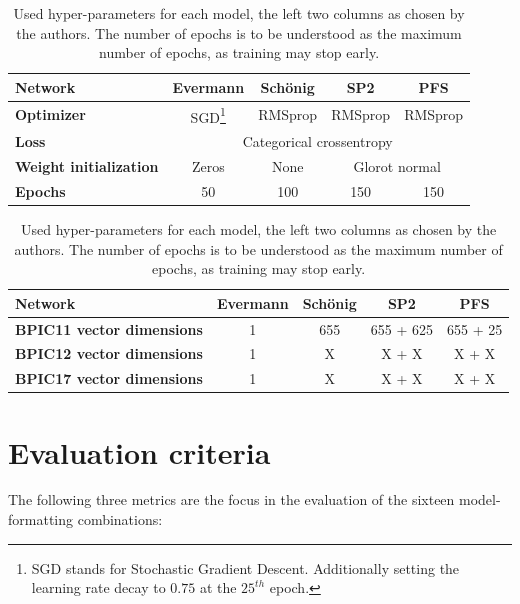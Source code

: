 \begin{table}[ht!]
    \centering
    \begin{tabular}{lcccc}
        \textbf{Network} & \textbf{Evermann} & \textbf{Schönig} & \textbf{SP2} & \textbf{PFS}\\
        \hline
        \textbf{Optimizer} & SGD\footnote{SGD stands for Stochastic Gradient Descent. Additionally setting the learning rate decay to $0.75$ at the $25^{th}$ epoch.} & RMSprop  & RMSprop & RMSprop\\
        \textbf{Loss}    &\multicolumn{4}{c}{Categorical crossentropy}\\
        \textbf{Weight initialization} & Zeros & None & \multicolumn{2}{c}{Glorot normal}\\
        \textbf{Epochs}  & 50 & 100 & 150 & 150\\
    \end{tabular}
    \caption{Used hyper-parameters for each model, the left two columns as chosen by the authors. The number of epochs is to be understood as the maximum number of epochs, as training may stop early.}
    \label{tab:training-setup}
\end{table}
\begin{table}[ht!]
    \centering
    \begin{tabular}{lcccc}
        \textbf{Network} & \textbf{Evermann} & \textbf{Schönig} & \textbf{SP2} & \textbf{PFS}\\
        \hline
        \textbf{BPIC11 vector dimensions} & 1 & 655 & 655 + 625 & 655 + 25 \\
        \textbf{BPIC12 vector dimensions} & 1 & X & X + X & X + X \\
        \textbf{BPIC17 vector dimensions} & 1 & X & X + X & X + X \\
    \end{tabular}
    \caption{Used hyper-parameters for each model, the left two columns as chosen by the authors. The number of epochs is to be understood as the maximum number of epochs, as training may stop early.}
    \label{tab:network-info}
\end{table}

\section{Evaluation criteria}
\label{sec:eval:criteria}
The following three metrics are the focus in the evaluation of the sixteen model-formatting combinations:

